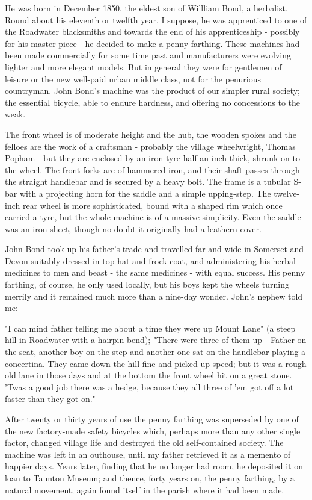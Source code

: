 He was born in December 1850, the eldest son of Willliam Bond, a herbalist. Round about his eleventh or twelfth year, I suppose, he was apprenticed to one of the Roadwater blacksmiths and towards the end of his apprenticeship - possibly for his master-piece - he decided to make a penny farthing. These machines had been made commercially for some time past and manufacturers were evolving lighter and more elegant models. But in general they were for gentlemen of leisure or the new well-paid urban middle class, not for the penurious countryman. John Bond's machine was the product of our simpler rural society; the essential bicycle, able to endure hardness, and offering no concessions to the weak.

The front wheel is of moderate height and the hub, the wooden spokes and the felloes are the work of a craftsman - probably the village wheelwright, Thomas Popham - but they are enclosed by an iron tyre half an inch thick, shrunk on to the wheel. The front forks are of hammered iron, and their shaft passes through the straight handlebar and is secured by a heavy bolt. The frame is a tubular S-bar with a projecting horn for the saddle and a simple upping-step. The twelve-inch rear wheel is more sophisticated, bound with a shaped rim which once carried a tyre, but the whole machine is of a massive simplicity. Even the saddle was an iron sheet, though no doubt it originally had a leathern cover.

John Bond took up his father's trade and travelled far and wide in Somerset and Devon suitably dressed in top hat and frock coat, and administering his herbal medicines to men and beast - the same medicines - with equal success. His penny farthing, of course, he only used locally, but his boys kept the wheels turning merrily and it remained much more than a nine-day wonder. John's nephew told me:

"I can mind father telling me about a time they were up Mount Lane" (a steep hill in Roadwater with a hairpin bend); "There were three of them up - Father on the seat, another boy on the step and another one sat on the handlebar playing a concertina. They came down the hill fine 	and picked up speed; but it was a rough old lane in those days and at the bottom the front wheel hit on a great stone. 'Twas a good job there was a hedge, because they all three of 'em got off a lot faster than they got on."

After twenty or thirty years of use the penny farthing was superseded by one of the new factory-made safety bicycles which, perhaps more than any other single factor, changed village life and destroyed the old self-contained society. The machine was left in an outhouse, until my father retrieved it as a memento of happier days. Years later, finding that he no longer had room, he deposited it on loan to Taunton Museum; and thence, forty years on, the penny farthing, by a natural movement, again found itself in the parish where it had been made.
 
